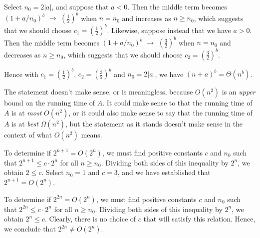 \documentclass[a4paper,12pt]{article}
\begin{document}
Select $n_0 = 2|a|$, and suppose that $a < 0$. Then the middle term becomes $\left(1 + a/n_0\right)^b$ $\rightarrow$ $\left(\frac{1}{2}\right)^b$ when $n=n_0$ and increases as $n \ge n_0$, which suggests that we should choose $c_1 = \left(\frac{1}{2}\right)^b$. Likewise, suppose instead that we have $a > 0$. Then the middle term becomes $\left(1 + a/n_0\right)^b$ $\rightarrow$ $\left(\frac{3}{2}\right)^b$ when $n=n_0$ and decreases as $n \ge n_0$, which suggests that we should choose $c_2 = \left(\frac{3}{2}\right)^b$.

Hence with $c_1 = \left(\frac{1}{2}\right)^b$, $c_2 = \left(\frac{3}{2}\right)^b$ and $n_0 = 2|a|$, we have $(n+a)^b = \Theta(n^b)$.

\vspace{2mm}

The statement doesn't make sense, or is meaningless, because $O(n^2)$ is an \textit{upper} bound on the running time of $A$. It could make sense to that the running time of $A$ is at \textit{most} $O(n^2)$, or it could also make sense to say that the running time of $A$ is at \textit{best} $\Omega(n^2)$, but the statement as it stands doesn't make sense in the context of what $O(n^2)$ means. 

\vspace{2mm}

To determine if $2^{n+1} = O(2^n)$, we must find positive constants $c$ and $n_0$ such that $2^{n+1} \le c \cdot 2^n$ for all $n \ge n_0$. Dividing both sides of this inequality by $2^n$, we obtain $2 \le c$. Select $n_0 = 1$ and $c = 3$, and we have established that $2^{n+1} = O(2^n)$.

To determine if $2^{2n} = O(2^n)$, we must find positive constants $c$ and $n_0$ such that $2^{2n} \le c \cdot 2^n$ for all $n \ge n_0$. Dividing both sides of this inequality by $2^n$, we obtain $2^n \le c$. Clearly, there is no choice of $c$ that will satisfy this relation. Hence,  we conclude that $2^{2n} \not= O(2^n)$.
\end{document}
